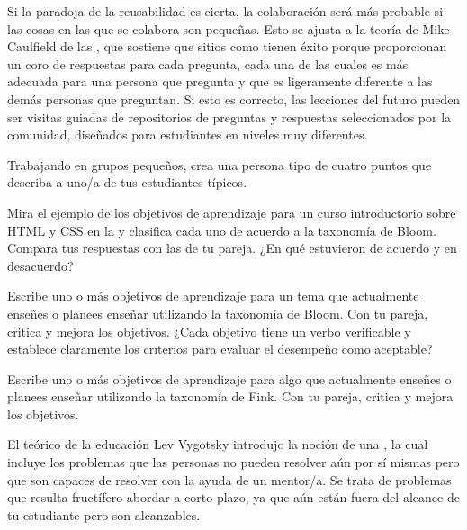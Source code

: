 Si la paradoja de la reusabilidad es cierta,
la colaboración será más probable
si las cosas en las que se colabora son pequeñas.
Esto se ajusta a la teoría de Mike Caulfield  de las
,
que sostiene que sitios como
 tienen éxito porque
proporcionan un coro de respuestas para cada pregunta,
cada una de las cuales es más adecuada para
una persona que pregunta y que es ligeramente diferente a las demás personas que preguntan.
Si esto es correcto,
las lecciones del futuro pueden ser visitas guiadas de repositorios
de preguntas y respuestas seleccionados por la comunidad,
diseñados para estudiantes en niveles muy diferentes.
 
 
 
 
Trabajando en grupos pequeños,
crea una persona tipo de cuatro puntos que describa a uno/a de tus estudiantes típicos.
 
 
Mira el ejemplo de los objetivos de aprendizaje
para un curso introductorio sobre HTML y CSS
en la 
y clasifica cada uno de acuerdo a la taxonomía de Bloom.
Compara tus respuestas con las de tu pareja.
¿En qué estuvieron de acuerdo y en desacuerdo?
 
 
Escribe uno o más objetivos de aprendizaje
para un tema que actualmente enseñes o planees enseñar
utilizando la taxonomía de Bloom.
Con tu pareja,
critica y mejora los objetivos.
¿Cada objetivo tiene un verbo verificable y establece claramente
los criterios para evaluar el desempeño como aceptable?
 
 
Escribe uno o más objetivos de aprendizaje
para algo que actualmente enseñes o planees enseñar
utilizando la taxonomía de Fink.
Con tu pareja,
critica y mejora los objetivos.
 
 
El teórico de la educación Lev Vygotsky introdujo la noción de una
,
la cual incluye los problemas que las personas no pueden resolver aún por sí mismas
pero que son capaces de resolver con la ayuda de un mentor/a.
Se trata de problemas que resulta fructífero abordar a corto plazo,
ya que aún están fuera del alcance de tu estudiante pero son alcanzables.
 

